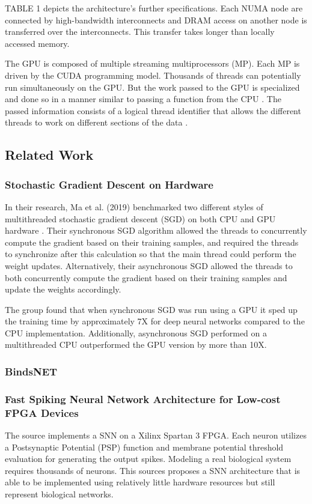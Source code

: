 \documentclass[journal]{IEEEtran}
\begin{document}
TABLE 1 depicts the architecture's further specifications. Each NUMA node are connected by high-bandwidth interconnects and DRAM access on another node is transferred over the interconnects. This transfer takes longer than locally accessed memory. 
\par
The GPU is composed of multiple streaming multiprocessors (MP). Each MP is driven by the CUDA programming model. Thousands of threads can potentially run simultaneously on the GPU. But the work passed to the GPU is specialized and done so in a manner similar to passing a function from the CPU \cite{Gupta2020}. The passed information consists of a logical thread identifier that allows the different threads to work on different sections of the data \cite{Gupta2020}.

\subsection{Related Work}

\subsubsection{Stochastic Gradient Descent on Hardware}

In their research, Ma et al. (2019) benchmarked two different styles of multithreaded stochastic gradient descent (SGD) on both CPU and GPU hardware \cite{ma2019stochastic}. Their synchronous SGD algorithm allowed the threads to concurrently compute the gradient based on their training samples, and required the threads to synchronize after this calculation so that the main thread could perform the weight updates. Alternatively, their asynchronous SGD allowed the threads to both concurrently compute the gradient based on their training samples and update the weights accordingly.

The group found that when synchronous SGD was run using a GPU it sped up the training time by approximately 7X for deep neural networks compared to the CPU implementation. Additionally, asynchronous SGD performed on a multithreaded CPU outperformed the GPU version by more than 10X.

\subsubsection{BindsNET}

\subsubsection{Fast Spiking Neural Network Architecture for Low-cost FPGA Devices}
\par
The source \cite{iakymchuk2012fast} implements a SNN on a Xilinx Spartan 3 FPGA. Each neuron utilizes a Postsynaptic Potential (PSP) function and membrane potential threshold evaluation for generating the output spikes. Modeling a real biological system requires thousands of neurons. This sources proposes a SNN architecture that is able to be implemented using relatively little hardware resources but still represent biological networks. 
\end{document}
